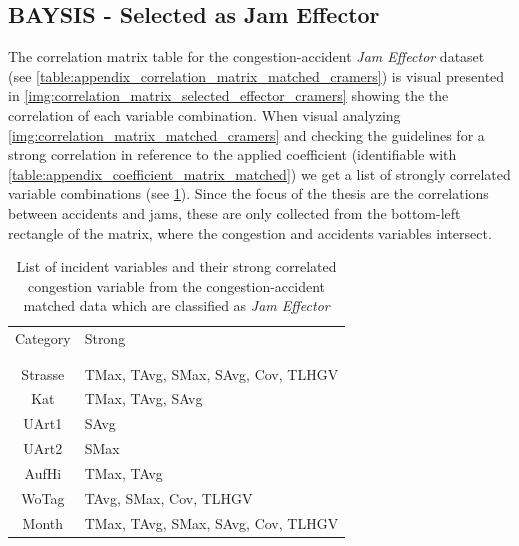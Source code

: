 \subsection{BAYSIS - Selected as Jam Effector}
\label{analysis_processing_correlation_baysis_effector}
The correlation matrix table for the congestion-accident \textit{Jam Effector} dataset (see \cref{table:appendix_correlation_matrix_matched_cramers}) is visual presented in \cref{img:correlation_matrix_selected_effector_cramers} showing the the correlation of each variable combination. When visual analyzing \cref{img:correlation_matrix_matched_cramers} and checking the guidelines for a strong correlation in reference to the applied coefficient (identifiable with \cref{table:appendix_coefficient_matrix_matched}) we get a list of strongly correlated variable combinations (see \cref{tbl:correlation_list_baysis_effector}). Since the focus of the thesis are the correlations between accidents and jams, these are only collected from the bottom-left rectangle of the matrix, where the congestion and accidents variables intersect.

\noindent
\begin{table}[h!]
	\centering
	\begin{tabular}{c|l}  
		Category & Strong \\
		\\[-1em]
		\hline
		\\[-1em]
		Strasse & TMax, TAvg, SMax, SAvg, Cov, TLHGV \\ 
 		Kat & TMax, TAvg, SAvg \\ 
 		UArt1 & SAvg \\
 		UArt2 & SMax \\
 		AufHi & TMax, TAvg \\
 		WoTag & TAvg, SMax, Cov, TLHGV \\
 		Month & TMax, TAvg, SMax, SAvg, Cov, TLHGV \\
	\end{tabular}
    \caption{List of incident variables and their strong correlated congestion variable from the congestion-accident matched data which are classified as \textit{Jam Effector}}
	\label{tbl:correlation_list_baysis_effector}
\end{table}

